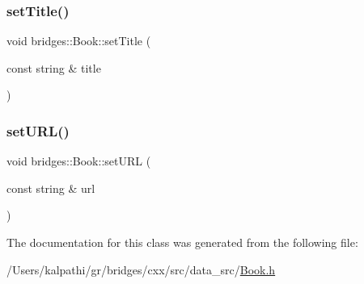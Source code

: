 \mbox{\label{classbridges_1_1_book_a68e4e04db8915b6baff809c46e6d1df9}} 
\subsubsection{\texorpdfstring{setTitle()}{setTitle()}}
{\footnotesize\ttfamily void bridges\+::\+Book\+::set\+Title (\begin{DoxyParamCaption}\item[{const string \&}]{title }\end{DoxyParamCaption})\hspace{0.3cm}{\ttfamily [inline]}}

\mbox{\label{classbridges_1_1_book_a48d590f296837b8eb9ac10451c83d23b}} 
\subsubsection{\texorpdfstring{setURL()}{setURL()}}
{\footnotesize\ttfamily void bridges\+::\+Book\+::set\+U\+RL (\begin{DoxyParamCaption}\item[{const string \&}]{url }\end{DoxyParamCaption})\hspace{0.3cm}{\ttfamily [inline]}}



The documentation for this class was generated from the following file\+:\begin{DoxyCompactItemize}
\item 
/\+Users/kalpathi/gr/bridges/cxx/src/data\+\_\+src/\mbox{\hyperlink{_book_8h}{Book.\+h}}\end{DoxyCompactItemize}
